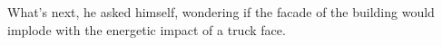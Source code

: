 

What's next, he asked himself, wondering if the facade of the building
would implode with the energetic impact of a truck face.

\bye
